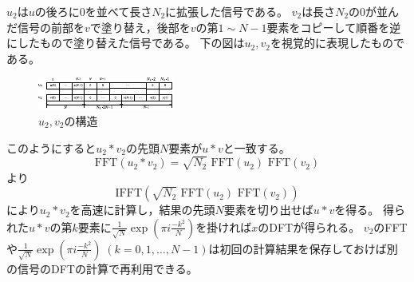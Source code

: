         $u_2$は$u$の後ろに$0$を並べて長さ$N_2$に拡張した信号である。
        $v_2$は長さ$N_2$の$0$が並んだ信号の前部を$v$で塗り替え，後部を$v$の第$1\sim N-1$要素をコピーして順番を逆にしたもので塗り替えた信号である。
        下の図は$u_2,v_2$を視覚的に表現したものである。
        \begin{figure}[H]
            \centering
            \includegraphics[keepaspectratio, scale=4]
            {parts/FourierSeries_and_FourierTransform/figs/FFT/arbitraryLengthFFT_to_powerOf2_FFT/u2,v2.pdf}
            \caption{$u_2,v_2$の構造}
        \end{figure}
        このようにすると$u_2*v_2$の先頭$N$要素が$u*v$と一致する。
        \[ \text{FFT}(u_2*v_2) = \sqrt{N_2}\text{ FFT}(u_2) \text{ FFT}(v_2) \]
        より
        \[ \text{IFFT}(\sqrt{N_2}\text{ FFT}(u_2) \text{ FFT}(v_2)) \]
        により$u_2*v_2$を高速に計算し，結果の先頭$N$要素を切り出せば$u*v$を得る。
        得られた$u*v$の第$k$要素に$\frac{1}{\sqrt{N}} \exp \left(\pi i\frac{-k^2}{N}\right)$を掛ければ$x$のDFTが得られる。
        $v_2$のFFTや$\frac{1}{\sqrt{N}} \exp \left(\pi i\frac{-k^2}{N}\right) \;(k=0,1,\dots,N-1)$は初回の計算結果を保存しておけば別の信号のDFTの計算で再利用できる。
